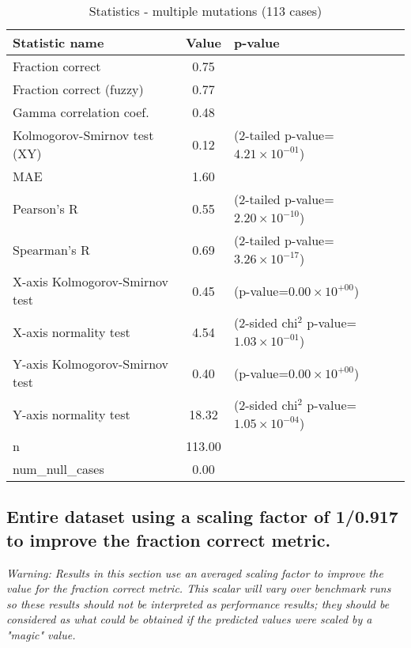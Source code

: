\documentclass[10pt, letterpaper, oneside, titlepage, landscape]{scrreprt}
\begin{document}
\begin{table}[H]\begin{center}
\begin{tabular}{ l S[table-format=3.2] l}
Statistic name & {Value} & p-value\\
\hline
Fraction correct & 0.75 & \\
Fraction correct (fuzzy) & 0.77 & \\
Gamma correlation coef. & 0.48 & \\
Kolmogorov-Smirnov test (XY) & 0.12 & (2-tailed p-value=$4.21\times10^{-01}$)\\
MAE & 1.60 & \\
Pearson's R & 0.55 & (2-tailed p-value=$2.20\times10^{-10}$)\\
Spearman's R & 0.69 & (2-tailed p-value=$3.26\times10^{-17}$)\\
X-axis Kolmogorov-Smirnov test & 0.45 & (p-value=$0.00\times10^{+00}$)\\
X-axis normality test & 4.54 & (2-sided chi$^{2}$ p-value=$1.03\times10^{-01}$)\\
Y-axis Kolmogorov-Smirnov test & 0.40 & (p-value=$0.00\times10^{+00}$)\\
Y-axis normality test & 18.32 & (2-sided chi$^{2}$ p-value=$1.05\times10^{-04}$)\\
n & 113.00 & \\
num\_null\_cases & 0.00 & \\
\end{tabular}
\caption{Statistics - multiple mutations (113 cases)}
\end{center}\end{table}


\subsection{Entire dataset using a scaling factor of 1/0.917 to improve the fraction correct metric.}
\textit{Warning: Results in this section use an averaged scaling factor to improve the value for the fraction correct metric. This scalar will vary over benchmark runs so these results should not be interpreted as performance results; they should be considered as what could be obtained if the predicted values were scaled by a "magic" value.}
\end{document}
